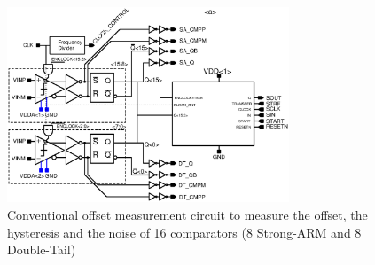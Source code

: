 \begin{figure}[htp]
    \centering
    \includegraphics[width=0.75\textwidth]{Chapter5/Figs/comp_test/test_offset_conv_bloc.ps}
    \caption{Conventional offset measurement circuit to measure the offset, the hysteresis and the noise of 16 comparators (8 Strong-ARM and 8 Double-Tail)}
    \label{fig:test-chip-comp-patterns-conv}
\end{figure}

